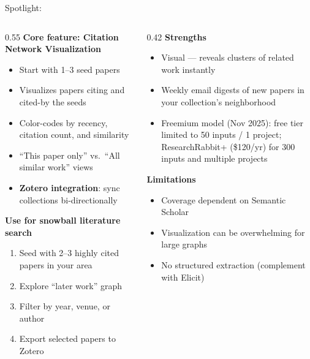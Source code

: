 \begin{frame}{Spotlight: }
  \begin{columns}[T, onlytextwidth]
    \begin{column}{0.55\textwidth}
      \small
      \textbf{Core feature: Citation Network Visualization}\\[0.2em]
      \begin{itemize}
        \item Start with 1--3 seed papers
        \item Visualizes papers citing and cited-by the seeds
        \item Color-codes by recency, citation count, and similarity
        \item ``This paper only'' vs.\ ``All similar work'' views
        \item \textbf{Zotero integration}: sync collections bi-directionally
      \end{itemize}
      \vspace{0.2em}
      \textbf{Use for snowball literature search}\\[0.2em]
      \begin{enumerate}
        \item Seed with 2--3 highly cited papers in your area
        \item Explore ``later work'' graph
        \item Filter by year, venue, or author
        \item Export selected papers to Zotero
      \end{enumerate}
    \end{column}
    \hfill
    \begin{column}{0.42\textwidth}
      \textbf{Strengths}\\[0.3em]
      \begin{itemize}
        \item Visual — reveals clusters of related work instantly
        \item Weekly email digests of new papers in your collection's neighborhood
        \item Freemium model (Nov 2025): free tier limited to 50 inputs / 1 project;\\
              ResearchRabbit+ (\$120/yr) for 300 inputs and multiple projects
      \end{itemize}
      \vspace{0.5em}
      \textbf{Limitations}\\[0.3em]
      \begin{itemize}
        \item Coverage dependent on Semantic Scholar
        \item Visualization can be overwhelming for large graphs
        \item No structured extraction (complement with Elicit)
      \end{itemize}
    \end{column}
  \end{columns}
\end{frame}


